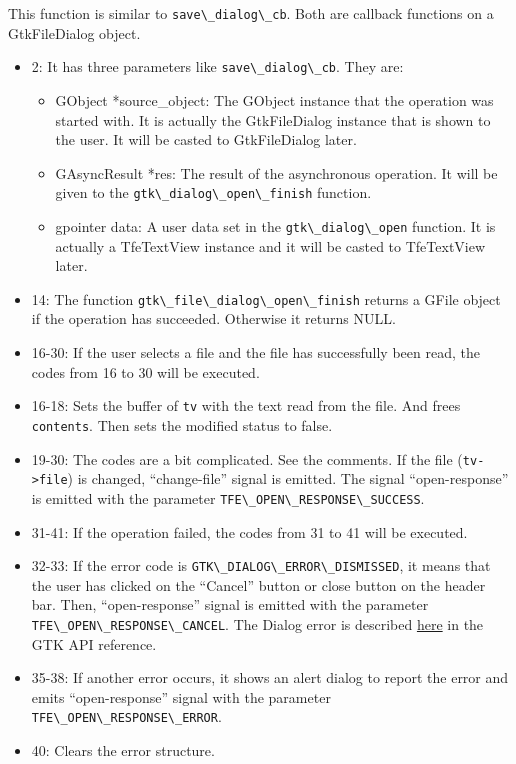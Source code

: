 This function is similar to \passthrough{\lstinline!save\_dialog\_cb!}.
Both are callback functions on a GtkFileDialog object.

\begin{itemize}
\tightlist
\item
  2: It has three parameters like
  \passthrough{\lstinline!save\_dialog\_cb!}. They are:

  \begin{itemize}
  \tightlist
  \item
    GObject *source\_object: The GObject instance that the operation was
    started with. It is actually the GtkFileDialog instance that is
    shown to the user. It will be casted to GtkFileDialog later.
  \item
    GAsyncResult *res: The result of the asynchronous operation. It will
    be given to the \passthrough{\lstinline!gtk\_dialog\_open\_finish!}
    function.
  \item
    gpointer data: A user data set in the
    \passthrough{\lstinline!gtk\_dialog\_open!} function. It is actually
    a TfeTextView instance and it will be casted to TfeTextView later.
  \end{itemize}
\item
  14: The function
  \passthrough{\lstinline!gtk\_file\_dialog\_open\_finish!} returns a
  GFile object if the operation has succeeded. Otherwise it returns
  NULL.
\item
  16-30: If the user selects a file and the file has successfully been
  read, the codes from 16 to 30 will be executed.
\item
  16-18: Sets the buffer of \passthrough{\lstinline!tv!} with the text
  read from the file. And frees \passthrough{\lstinline!contents!}. Then
  sets the modified status to false.
\item
  19-30: The codes are a bit complicated. See the comments. If the file
  (\passthrough{\lstinline!tv->file!}) is changed, ``change-file''
  signal is emitted. The signal ``open-response'' is emitted with the
  parameter \passthrough{\lstinline!TFE\_OPEN\_RESPONSE\_SUCCESS!}.
\item
  31-41: If the operation failed, the codes from 31 to 41 will be
  executed.
\item
  32-33: If the error code is
  \passthrough{\lstinline!GTK\_DIALOG\_ERROR\_DISMISSED!}, it means that
  the user has clicked on the ``Cancel'' button or close button on the
  header bar. Then, ``open-response'' signal is emitted with the
  parameter \passthrough{\lstinline!TFE\_OPEN\_RESPONSE\_CANCEL!}. The
  Dialog error is described
  \href{https://docs.gtk.org/gtk4/error.DialogError.html}{here} in the
  GTK API reference.
\item
  35-38: If another error occurs, it shows an alert dialog to report the
  error and emits ``open-response'' signal with the parameter
  \passthrough{\lstinline!TFE\_OPEN\_RESPONSE\_ERROR!}.
\item
  40: Clears the error structure.
\end{itemize}

